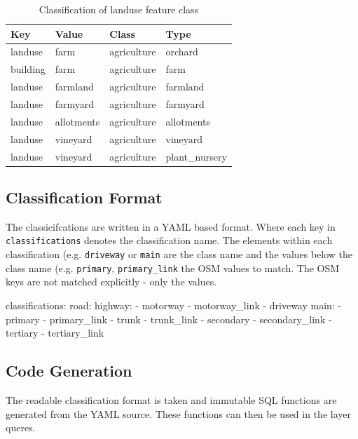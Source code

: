\begin{table}[H]
\centering
    \begin{tabular}{llll}
    Key      & Value      & Class       & Type           \\
    \hline
    landuse  & farm       & agriculture & orchard        \\
    building & farm       & agriculture & farm           \\
    landuse  & farmland   & agriculture & farmland       \\
    landuse  & farmyard   & agriculture & farmyard       \\
    landuse  & allotments & agriculture & allotments     \\
    landuse  & vineyard   & agriculture & vineyard       \\
    landuse  & vineyard   & agriculture & plant\_nursery
    \end{tabular}
    \caption{Classification of landuse feature class}
\end{table}

\subsection{Classification Format}

The classicifcations are written in a YAML based format.
Where each key in \texttt{classifications} denotes the classification name. The elements within each classification (e.g. \texttt{driveway} or \texttt{main} are the class name and the values below the class name (e.g. \texttt{primary}, \texttt{primary\_link} the OSM values to match.
The OSM keys are not matched explicitly - only the values.

\begin{yamlcode}
classifications:
  road:
    highway:
    - motorway
    - motorway_link
    - driveway
    main:
    - primary
    - primary_link
    - trunk
    - trunk_link
    - secondary
    - secondary_link
    - tertiary
    - tertiary_link
\end{yamlcode}

\subsection{Code Generation}

The readable classification format is taken and immutable SQL functions are generated
from the YAML source. These functions can then be used in the layer queres.

